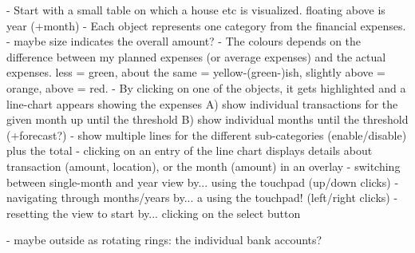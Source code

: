 - Start with a small table on which a house etc is visualized. floating above is year (+month)
- Each object represents one category from the financial expenses.
- maybe size indicates the overall amount?
- The colours depends on the difference between my planned expenses (or average expenses) and the actual expenses. less = green, about the same = yellow-(green-)ish, slightly above = orange, above = red.
- By clicking on one of the objects, it gets highlighted and a line-chart appears showing the expenses
   A) show individual transactions for the given month up until the threshold
   B) show individual months until the threshold (+forecast?)
- show multiple lines for the different sub-categories (enable/disable) plus the total
- clicking on an entry of the line chart displays details about transaction (amount, location), or the month (amount) in an overlay
- switching between single-month and year view by... using the touchpad (up/down clicks)
- navigating through months/years by... a using the touchpad! (left/right clicks)
- resetting the view to start by... clicking on the select button

- maybe outside as rotating rings: the individual bank accounts?

